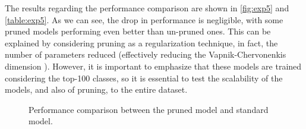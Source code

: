 The results regarding the performance comparison are shown in \autoref{fig:exp5} and \autoref{table:exp5}. As we can see, the drop in performance is negligible, with some pruned models performing even better than un-pruned ones. This can be explained by considering pruning as a regularization technique, in fact, the number of parameters reduced (effectively reducing the Vapnik-Chervonenkis dimension \cite{vapnik1999nature}). However, it is important to emphasize that these models are trained considering the top-100 classes, so it is essential to test the scalability of the models, and also of pruning, to the entire dataset.


\begin{figure}[H]
	\centering
    \qquad
	\caption{Performance comparison between the pruned model and standard model.}%
	\label{fig:exp5}%
\end{figure}

